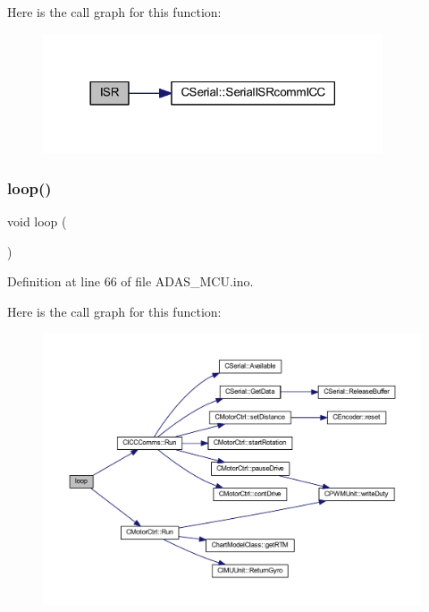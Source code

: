 Here is the call graph for this function\+:
\nopagebreak
\begin{figure}[H]
\begin{center}
\leavevmode
\includegraphics[width=285pt]{_a_d_a_s___m_c_u_8ino_a63a86aad9ba2e355fe6380da553f554e_cgraph}
\end{center}
\end{figure}
\mbox{\label{_a_d_a_s___m_c_u_8ino_afe461d27b9c48d5921c00d521181f12f}} 
\subsubsection{\texorpdfstring{loop()}{loop()}}
{\footnotesize\ttfamily void loop (\begin{DoxyParamCaption}{ }\end{DoxyParamCaption})}



Definition at line 66 of file A\+D\+A\+S\+\_\+\+M\+C\+U.\+ino.

Here is the call graph for this function\+:
\nopagebreak
\begin{figure}[H]
\begin{center}
\leavevmode
\includegraphics[width=350pt]{_a_d_a_s___m_c_u_8ino_afe461d27b9c48d5921c00d521181f12f_cgraph}
\end{center}
\end{figure}
\mbox{\label{_a_d_a_s___m_c_u_8ino_a4fc01d736fe50cf5b977f755b675f11d}} 
